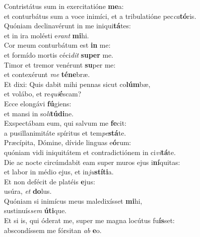 \evenverse Contristátus sum in exercitatióne \textbf{me}a:~\*\\
\evenverse et conturbátus sum a voce inimíci, et a tribulatióne pec\textit{ca}\textbf{tó}ris.\\
\oddverse Quóniam declinavérunt in me iniqui\textbf{tá}tes:~\*\\
\oddverse et in ira molésti e\textit{rant} \textbf{mi}hi.\\
\evenverse Cor meum conturbátum est \textbf{in} me:~\*\\
\evenverse et formído mortis céci\textit{dit} \textbf{su}\textbf{per} me.\\
\oddverse Timor et tremor venérunt \textbf{su}per me:~\*\\
\oddverse et contexérunt \textit{me} \textbf{té}\textbf{ne}bræ.\\
\evenverse Et dixi: Quis dabit mihi pennas sicut co\textbf{lúm}bæ,~\*\\
\evenverse et volábo, et re\textit{qui}\textbf{é}scam?\\
\oddverse Ecce elongávi \textbf{fú}giens:~\*\\
\oddverse et mansi in so\textit{li}\textbf{tú}\textbf{di}ne.\\
\evenverse Exspectábam eum, qui salvum me \textbf{fe}cit:~\*\\
\evenverse a pusillanimitáte spíritus et tem\textit{pe}\textbf{stá}te.\\
\oddverse Præcípita, Dómine, dívide linguas e\textbf{ó}rum:~\*\\
\oddverse quóniam vidi iniquitátem et contradictiónem in ci\textit{vi}\textbf{tá}te.\\
\evenverse Die ac nocte circúmdabit eam super muros ejus i\textbf{ní}quitas:~\*\\
\evenverse et labor in médio ejus, et in\textit{ju}\textbf{stí}\textbf{ti}a.\\
\oddverse Et non defécit de platéis \textbf{e}jus:~\*\\
\oddverse usúra, \textit{et} \textbf{do}lus.\\
\evenverse Quóniam si inimícus meus maledixísset \textbf{mi}hi,~\*\\
\evenverse sustinuís\textit{sem} \textbf{ú}\textbf{ti}que.\\
\oddverse Et si is, qui óderat me, super me magna locútus fu\textbf{ís}set:~\*\\
\oddverse abscondíssem me fórsitan \textit{ab} \textbf{e}o.\\
